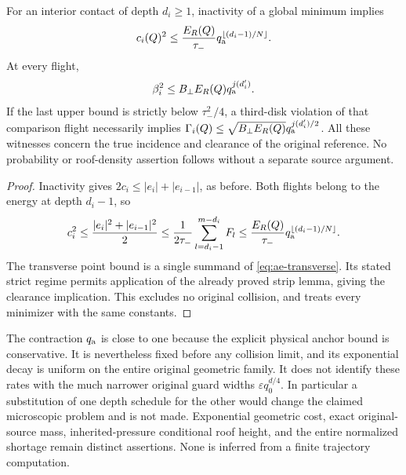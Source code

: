 \begin{corollary}
\label{cor:ae-witnesses}
For an interior contact of depth $d_i\ge1$, inactivity of a global
minimum implies
\begin{equation}\label{eq:ae-inactive-witness}
 c_i(Q)^2\le\frac{E_R(Q)}{\tau_-}
           q_{\rm a}^{\lfloor(d_i-1)/N\rfloor}.
\end{equation}
At every flight,
\begin{equation}\label{eq:ae-clearance-witness}
 \beta_i^2\le B_\perp E_R(Q)q_{\rm a}^{j(d'_i)}.
\end{equation}
If the last upper bound is strictly below $\tau_-^2/4$, a third-disk
violation of that comparison flight necessarily implies
$\Gamma_i(Q)\le\sqrt{B_\perp E_R(Q)}q_{\rm a}^{j(d'_i)/2}$.
All these witnesses concern the true incidence and clearance of the
original reference.  No probability or roof-density assertion follows
without a separate source argument.
\end{corollary}
\begin{proof}
Inactivity gives $2c_i\le|e_i|+|e_{i-1}|$, as before.  Both flights
belong to the energy at depth $d_i-1$, so
\[
 c_i^2\le\frac{|e_i|^2+|e_{i-1}|^2}{2}
       \le\frac1{2\tau_-}\sum_{l=d_i-1}^{m-d_i}F_l
       \le\frac{E_R(Q)}{\tau_-}
                    q_{\rm a}^{\lfloor(d_i-1)/N\rfloor}.
\]
The transverse point bound is a single summand of
\eqref{eq:ae-transverse}.  Its stated strict regime permits application
of the already proved strip lemma, giving the clearance implication.
This excludes no original collision, and treats every minimizer with
the same constants.
\end{proof}

\begin{remark}
The contraction $q_{\rm a}$ is close to one because the explicit
physical anchor bound is conservative.  It is nevertheless fixed
before any collision limit, and its exponential decay is uniform on
the entire original geometric family.  It does not identify these
rates with the much narrower original guard widths
$\varepsilon q_0^{d/4}$.  In particular a substitution of one depth
schedule for the other would change the claimed microscopic problem
and is not made.  Exponential geometric cost, exact original-source
mass, inherited-pressure conditional roof height, and the entire
normalized shortage remain distinct assertions.  None is inferred
from a finite trajectory computation.
\end{remark}
